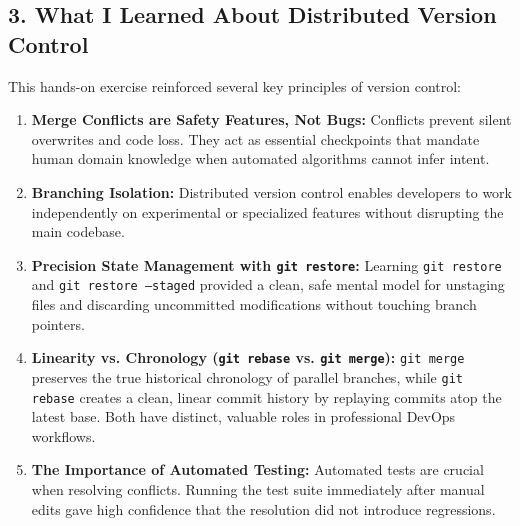\documentclass[11pt,a4paper]{article}
\begin{document}
\subsection{3. What I Learned About Distributed Version Control}
This hands-on exercise reinforced several key principles of version control:
\begin{enumerate}
    \item \textbf{Merge Conflicts are Safety Features, Not Bugs:} Conflicts prevent silent overwrites and code loss. They act as essential checkpoints that mandate human domain knowledge when automated algorithms cannot infer intent.
    \item \textbf{Branching Isolation:} Distributed version control enables developers to work independently on experimental or specialized features without disrupting the main codebase.
    \item \textbf{Precision State Management with \texttt{git restore}:} Learning \texttt{git restore} and \texttt{git restore --staged} provided a clean, safe mental model for unstaging files and discarding uncommitted modifications without touching branch pointers.
    \item \textbf{Linearity vs. Chronology (\texttt{git rebase} vs. \texttt{git merge}):} \texttt{git merge} preserves the true historical chronology of parallel branches, while \texttt{git rebase} creates a clean, linear commit history by replaying commits atop the latest base. Both have distinct, valuable roles in professional DevOps workflows.
    \item \textbf{The Importance of Automated Testing:} Automated tests are crucial when resolving conflicts. Running the test suite immediately after manual edits gave high confidence that the resolution did not introduce regressions.
\end{enumerate}
\end{document}
